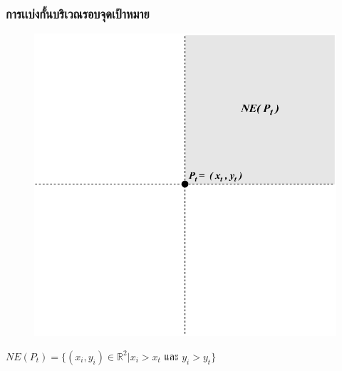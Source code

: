 \documentclass[12pt,aspectratio=169]{beamer}
\begin{document}
\begin{frame}
\frametitle{การเเบ่งกั้นบริเวณรอบจุดเป้าหมาย}
\begin{center}
                \begin{figure}
                    \includegraphics[scale=0.5]{img/NEP_t.pdf}
                \end{figure}
               $ NE(P_t) = \{(x_{i} , y_{i}) \in \mathbb{R}^2 | x_{i} > x_{t} \text{ และ } y_{i} > y_{t}\} $
            \end{center}
\end{frame}
\end{document}
